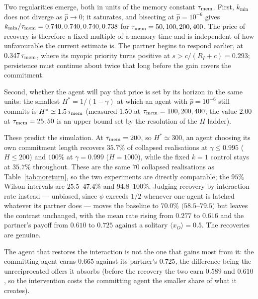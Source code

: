 \documentclass[aps,pre,twocolumn,superscriptaddress,floatfix,longbibliography]{revtex4-2}
\begin{document}
Two regularities emerge, both in units of the memory constant $\tau_{\rm mem}$.
First, $k_{\min}$ does not diverge as $\hat p \to 0$; it saturates, and bisecting
at $\hat p = 10^{-6}$ gives $k_{\min}/\tau_{\rm mem} = 0.740, 0.740, 0.740,
0.738$ for $\tau_{\rm mem} = 50, 100, 200, 400$. The price of recovery is
therefore a fixed multiple of a memory time and is independent of how
unfavourable the current estimate is. The partner begins to respond earlier, at
$0.347\,\tau_{\rm mem}$, where its myopic priority turns positive at
$s>c/(R_I+c)=0.293$; persistence must continue about twice that long before the
gain covers the commitment.

Second, whether the agent will pay that price is set by its horizon in the same
units: the smallest $H^{*} = 1/(1-\gamma)$ at which an agent with $\hat p =
10^{-6}$ still commits is $H^{*} \simeq 1.5\,\tau_{\rm mem}$ (measured $1.50$ at
$\tau_{\rm mem} = 100, 200, 400$; the value $2.00$ at $\tau_{\rm mem} = 25, 50$
is an upper bound set by the resolution of the $H$ ladder).

These predict the simulation. At $\tau_{\rm mem}=200$, so $H^{*}\simeq300$, an
agent choosing its own commitment length recovers $35.7\%$
of collapsed
realisations at $\gamma \le 0.995$ ($H \le 200$) and $100\%$ at $\gamma=0.999$
($H=1000$), while the fixed $k=1$ control stays at $35.7\%$
throughout. These are the same $70$ collapsed realisations as
Table~\ref{tab:noreturn}, so the two experiments are directly comparable; the
$95\%$ Wilson intervals are $25.5$--$47.4\%$ and $94.8$--$100\%$.
Judging recovery by interaction rate instead --- unbiased, since $\phi$ exceeds
$1/2$ whenever one agent is latched whatever its partner does --- moves the
baseline to $70.0\%$ $(58.5$--$79.5)$ but leaves the
contrast unchanged, with the mean rate
rising from $0.277$ to $0.616$ and the partner's
payoff from $0.610$ to $0.725$
against a solitary $\langle x_O\rangle=0.5$. The recoveries are genuine.

The agent that restores the interaction is not the one that gains most from it:
the committing agent earns $0.665$ against its
partner's $0.725$,
the difference being the unreciprocated offers it absorbs (before the
recovery the two earn $0.589$ and $0.610$, so the intervention costs the
committing agent the smaller share of what it creates).
\end{document}
